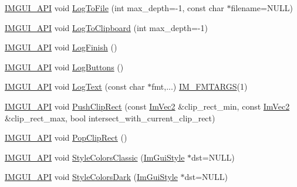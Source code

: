 \begin{DoxyCompactItemize}
\mbox{\hyperlink{imgui_8h_a43829975e84e45d1149597467a14bbf5}{I\+M\+G\+U\+I\+\_\+\+A\+PI}} void \mbox{\hyperlink{namespace_im_gui_ab62461a65c153b9f40842debef8aa755}{Log\+To\+File}} (int max\+\_\+depth=-\/1, const char $\ast$filename=N\+U\+LL)
\item 
\mbox{\hyperlink{imgui_8h_a43829975e84e45d1149597467a14bbf5}{I\+M\+G\+U\+I\+\_\+\+A\+PI}} void \mbox{\hyperlink{namespace_im_gui_a81add991d176834b8a6e315dfc78e4f7}{Log\+To\+Clipboard}} (int max\+\_\+depth=-\/1)
\item 
\mbox{\hyperlink{imgui_8h_a43829975e84e45d1149597467a14bbf5}{I\+M\+G\+U\+I\+\_\+\+A\+PI}} void \mbox{\hyperlink{namespace_im_gui_a2ebcd048d1ca025fb972e1c2e920e3f3}{Log\+Finish}} ()
\item 
\mbox{\hyperlink{imgui_8h_a43829975e84e45d1149597467a14bbf5}{I\+M\+G\+U\+I\+\_\+\+A\+PI}} void \mbox{\hyperlink{namespace_im_gui_a7bd295da4be19bab98262c76fcaeb4fb}{Log\+Buttons}} ()
\item 
\mbox{\hyperlink{imgui_8h_a43829975e84e45d1149597467a14bbf5}{I\+M\+G\+U\+I\+\_\+\+A\+PI}} void \mbox{\hyperlink{namespace_im_gui_aa548475d8f771ab6524d73d900a41198}{Log\+Text}} (const char $\ast$fmt,...) \mbox{\hyperlink{imgui_8h_a1251c2f9ddac0873dbad8181bd82c9f1}{I\+M\+\_\+\+F\+M\+T\+A\+R\+GS}}(1)
\item 
\mbox{\hyperlink{imgui_8h_a43829975e84e45d1149597467a14bbf5}{I\+M\+G\+U\+I\+\_\+\+A\+PI}} void \mbox{\hyperlink{namespace_im_gui_a11c8bd8676e1281e15b24c9615b6904a}{Push\+Clip\+Rect}} (const \mbox{\hyperlink{struct_im_vec2}{Im\+Vec2}} \&clip\+\_\+rect\+\_\+min, const \mbox{\hyperlink{struct_im_vec2}{Im\+Vec2}} \&clip\+\_\+rect\+\_\+max, bool intersect\+\_\+with\+\_\+current\+\_\+clip\+\_\+rect)
\item 
\mbox{\hyperlink{imgui_8h_a43829975e84e45d1149597467a14bbf5}{I\+M\+G\+U\+I\+\_\+\+A\+PI}} void \mbox{\hyperlink{namespace_im_gui_aef1c8a6e5a3c70cb10d03d2a2a66dfd8}{Pop\+Clip\+Rect}} ()
\item 
\mbox{\hyperlink{imgui_8h_a43829975e84e45d1149597467a14bbf5}{I\+M\+G\+U\+I\+\_\+\+A\+PI}} void \mbox{\hyperlink{namespace_im_gui_a1cf931a42a10f71150def3ce222434b6}{Style\+Colors\+Classic}} (\mbox{\hyperlink{struct_im_gui_style}{Im\+Gui\+Style}} $\ast$dst=N\+U\+LL)
\item 
\mbox{\hyperlink{imgui_8h_a43829975e84e45d1149597467a14bbf5}{I\+M\+G\+U\+I\+\_\+\+A\+PI}} void \mbox{\hyperlink{namespace_im_gui_a26c67fc14081b359566d5e135cd8c767}{Style\+Colors\+Dark}} (\mbox{\hyperlink{struct_im_gui_style}{Im\+Gui\+Style}} $\ast$dst=N\+U\+LL)

\end{DoxyCompactItemize}
